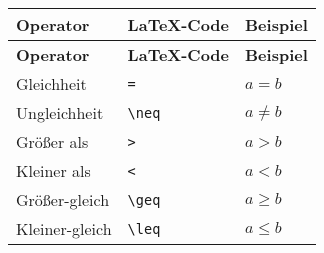 \begin{longtable}{l l l}
    \\
    \toprule
    \textbf{Operator}         & \textbf{LaTeX-Code}                                                                     & \textbf{Beispiel}                    \\
    \midrule
    \endfirsthead
    \toprule
    \textbf{Operator}         & \textbf{LaTeX-Code}                                                                     & \textbf{Beispiel}                    \\
    \midrule
    \endhead

    \bottomrule
    \endlastfoot

    Gleichheit                & \texttt{=}                                                                              & $ a = b $                            \\
    Ungleichheit              & \texttt{\textbackslash neq}                                                             & $ a \neq b $                         \\
    Größer als                & \texttt{>}                                                                              & $ a > b $                            \\
    Kleiner als               & \texttt{<}                                                                              & $ a < b $                            \\
    Größer-gleich             & \texttt{\textbackslash geq}                                                             & $ a \geq b $                         \\
    Kleiner-gleich            & \texttt{\textbackslash leq}                                                             & $ a \leq b $                         \\


\end{longtable}
